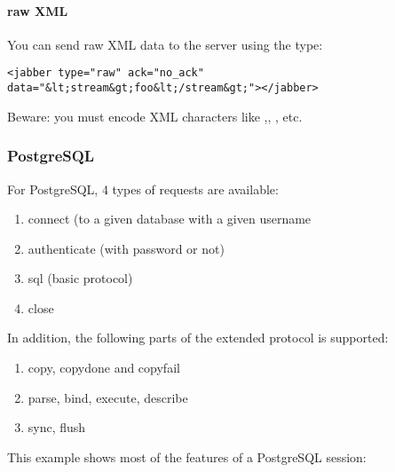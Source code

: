 \documentclass{TSUNG-en}
\begin{document}
\paragraph{raw XML}
You can send raw XML data to the server using the  type:
\begin{Verbatim}
<jabber type="raw" ack="no_ack" data="&lt;stream&gt;foo&lt;/stream&gt;"></jabber>
\end{Verbatim}

Beware: you must encode XML characters like \userinput{<}
,\userinput{>}, \userinput{\&}, etc.

\subsubsection{PostgreSQL}

For PostgreSQL, 4 types of requests are available:
\begin{enumerate}
\item connect (to a given database with a given username
\item authenticate (with password or not)
\item sql (basic protocol)
\item close
\end{enumerate}

In addition, the following parts of the extended protocol is supported:
\begin{enumerate}
\item copy, copydone and copyfail
\item parse, bind, execute, describe
\item sync, flush
\end{enumerate}

This example shows most of the features of a PostgreSQL session:
\end{document}
